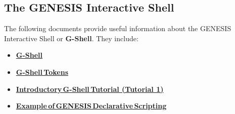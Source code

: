 \documentclass[12pt]{article}
\begin{document}
\subsection*{The GENESIS Interactive Shell}

The following documents provide useful information about the GENESIS Interactive Shell or {\bf G-Shell}. They include:

\begin{itemize}
\item \href{../gshell/gshell.tex}{\bf G-Shell}
\item \href{../shell-tokens/shell-tokens.tex}{\bf G-Shell\,Tokens}
\item \href{../tutorial1/tutorial1.tex}{\bf Introductory\,G-Shell\,Tutorial (Tutorial 1)}
\item \href{../example-script1/example-script1.tex}{\bf Example\,of\,GENESIS\,Declarative\,Scripting}
\end{itemize}
\end{document}
